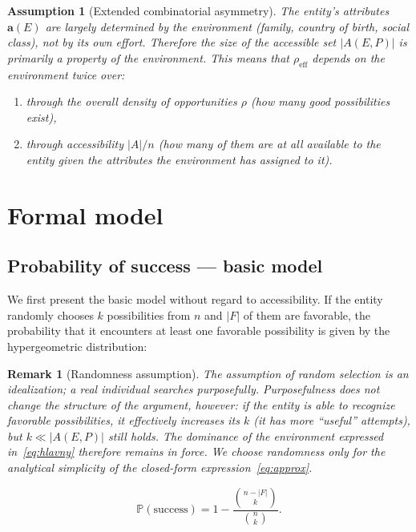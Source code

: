 \documentclass[12pt,a4paper]{article}
\newtheorem{assumption}{Assumption}[section]
\newtheorem{remark}{Remark}[section]
\begin{document}
\begin{assumption}[Extended combinatorial asymmetry]\label{asp:rozsirena}
The entity's attributes $\mathbf{a}(E)$ are largely determined by the environment (family, country of birth, social class), not by its own effort. Therefore the size of the accessible set $|A(E, P)|$ is primarily a property of the environment. This means that $\rho_{\text{eff}}$ depends on the environment twice over:
\begin{enumerate}
    \item through the overall density of opportunities $\rho$ (how many good possibilities exist),
    \item through accessibility $|A|/n$ (how many of them are at all available to the entity given the attributes the environment has assigned to it).
\end{enumerate}
\end{assumption}

\section{Formal model}

\subsection{Probability of success — basic model}

We first present the basic model without regard to accessibility. If the entity randomly chooses $k$ possibilities from $n$ and $|F|$ of them are favorable, the probability that it encounters at least one favorable possibility is given by the hypergeometric distribution:

\begin{remark}[Randomness assumption]
The assumption of random selection is an idealization; a real individual searches purposefully. Purposefulness does not change the structure of the argument, however: if the entity is able to recognize favorable possibilities, it effectively increases its $k$ (it has more ``useful'' attempts), but $k \ll |A(E,P)|$ still holds. The dominance of the environment expressed in~\eqref{eq:hlavny} therefore remains in force. We choose randomness only for the analytical simplicity of the closed-form expression~\eqref{eq:approx}.
\end{remark}


\begin{equation}\label{eq:presny}
    \mathbb{P}(\text{success}) = 1 - \frac{\binom{n - |F|}{k}}{\binom{n}{k}}.
\end{equation}
\end{document}
